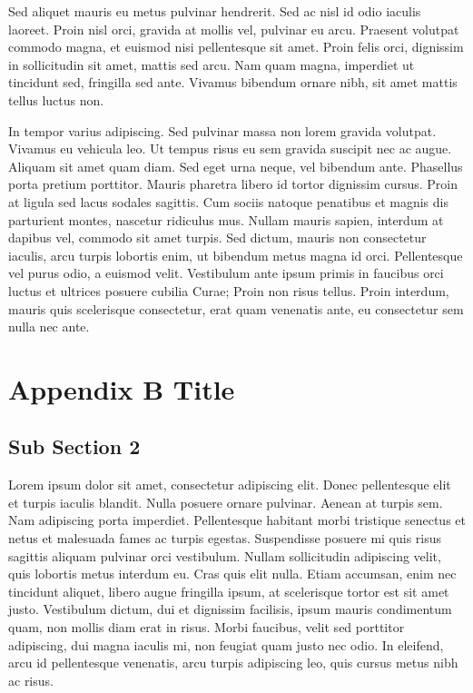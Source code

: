 Sed aliquet mauris eu metus pulvinar hendrerit. Sed ac nisl id odio iaculis laoreet. Proin nisl orci, gravida at mollis vel, pulvinar eu arcu. Praesent volutpat commodo magna, et euismod nisi pellentesque sit amet. Proin felis orci, dignissim in sollicitudin sit amet, mattis sed arcu. Nam quam magna, imperdiet ut tincidunt sed, fringilla sed ante. Vivamus bibendum ornare nibh, sit amet mattis tellus luctus non.

In tempor varius adipiscing. Sed pulvinar massa non lorem gravida volutpat. Vivamus eu vehicula leo. Ut tempus risus eu sem gravida suscipit nec ac augue. Aliquam sit amet quam diam. Sed eget urna neque, vel bibendum ante. Phasellus porta pretium porttitor. Mauris pharetra libero id tortor dignissim cursus. Proin at ligula sed lacus sodales sagittis. Cum sociis natoque penatibus et magnis dis parturient montes, nascetur ridiculus mus. Nullam mauris sapien, interdum at dapibus vel, commodo sit amet turpis. Sed dictum, mauris non consectetur iaculis, arcu turpis lobortis enim, ut bibendum metus magna id orci. Pellentesque vel purus odio, a euismod velit. Vestibulum ante ipsum primis in faucibus orci luctus et ultrices posuere cubilia Curae; Proin non risus tellus. Proin interdum, mauris quis scelerisque consectetur, erat quam venenatis ante, eu consectetur sem nulla nec ante. 


\clearemptydoublepage


\chapter{Appendix B Title}\label{chap:AppB}
\clearemptydoublepage

\section*{Sub Section 2}

Lorem ipsum dolor sit amet, consectetur adipiscing elit. Donec pellentesque elit et turpis iaculis blandit. Nulla posuere ornare pulvinar. Aenean at turpis sem. Nam adipiscing porta imperdiet. Pellentesque habitant morbi tristique senectus et netus et malesuada fames ac turpis egestas. Suspendisse posuere mi quis risus sagittis aliquam pulvinar orci vestibulum. Nullam sollicitudin adipiscing velit, quis lobortis metus interdum eu. Cras quis elit nulla. Etiam accumsan, enim nec tincidunt aliquet, libero augue fringilla ipsum, at scelerisque tortor est sit amet justo. Vestibulum dictum, dui et dignissim facilisis, ipsum mauris condimentum quam, non mollis diam erat in risus. Morbi faucibus, velit sed porttitor adipiscing, dui magna iaculis mi, non feugiat quam justo nec odio. In eleifend, arcu id pellentesque venenatis, arcu turpis adipiscing leo, quis cursus metus nibh ac risus.

